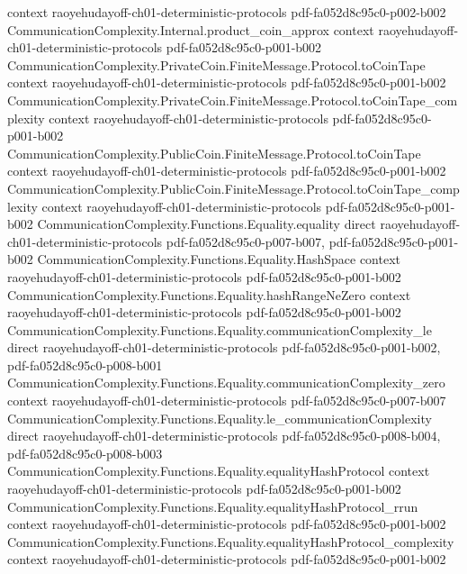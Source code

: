 \begin{theorem}
  {context}
  {raoyehudayoff-ch01-deterministic-protocols}
  {pdf-fa052d8c95c0-p002-b002}
\proofstep
  {CommunicationComplexity.Internal.product_coin_approx}
  {context}
  {raoyehudayoff-ch01-deterministic-protocols}
  {pdf-fa052d8c95c0-p001-b002}
\proofstep
  {CommunicationComplexity.PrivateCoin.FiniteMessage.Protocol.toCoinTape}
  {context}
  {raoyehudayoff-ch01-deterministic-protocols}
  {pdf-fa052d8c95c0-p001-b002}
\proofstep
  {CommunicationComplexity.PrivateCoin.FiniteMessage.Protocol.toCoinTape_complexity}
  {context}
  {raoyehudayoff-ch01-deterministic-protocols}
  {pdf-fa052d8c95c0-p001-b002}
\proofstep
  {CommunicationComplexity.PublicCoin.FiniteMessage.Protocol.toCoinTape}
  {context}
  {raoyehudayoff-ch01-deterministic-protocols}
  {pdf-fa052d8c95c0-p001-b002}
\proofstep
  {CommunicationComplexity.PublicCoin.FiniteMessage.Protocol.toCoinTape_complexity}
  {context}
  {raoyehudayoff-ch01-deterministic-protocols}
  {pdf-fa052d8c95c0-p001-b002}
\proofstep
  {CommunicationComplexity.Functions.Equality.equality}
  {direct}
  {raoyehudayoff-ch01-deterministic-protocols}
  {pdf-fa052d8c95c0-p007-b007,
    pdf-fa052d8c95c0-p001-b002}
\proofstep
  {CommunicationComplexity.Functions.Equality.HashSpace}
  {context}
  {raoyehudayoff-ch01-deterministic-protocols}
  {pdf-fa052d8c95c0-p001-b002}
\proofstep
  {CommunicationComplexity.Functions.Equality.hashRangeNeZero}
  {context}
  {raoyehudayoff-ch01-deterministic-protocols}
  {pdf-fa052d8c95c0-p001-b002}
\proofstep
  {CommunicationComplexity.Functions.Equality.communicationComplexity_le}
  {direct}
  {raoyehudayoff-ch01-deterministic-protocols}
  {pdf-fa052d8c95c0-p001-b002,
    pdf-fa052d8c95c0-p008-b001}
\proofstep
  {CommunicationComplexity.Functions.Equality.communicationComplexity_zero}
  {context}
  {raoyehudayoff-ch01-deterministic-protocols}
  {pdf-fa052d8c95c0-p007-b007}
\proofstep
  {CommunicationComplexity.Functions.Equality.le_communicationComplexity}
  {direct}
  {raoyehudayoff-ch01-deterministic-protocols}
  {pdf-fa052d8c95c0-p008-b004,
    pdf-fa052d8c95c0-p008-b003}
\proofstep
  {CommunicationComplexity.Functions.Equality.equalityHashProtocol}
  {context}
  {raoyehudayoff-ch01-deterministic-protocols}
  {pdf-fa052d8c95c0-p001-b002}
\proofstep
  {CommunicationComplexity.Functions.Equality.equalityHashProtocol_rrun}
  {context}
  {raoyehudayoff-ch01-deterministic-protocols}
  {pdf-fa052d8c95c0-p001-b002}
\proofstep
  {CommunicationComplexity.Functions.Equality.equalityHashProtocol_complexity}
  {context}
  {raoyehudayoff-ch01-deterministic-protocols}
  {pdf-fa052d8c95c0-p001-b002}

\end{theorem}
